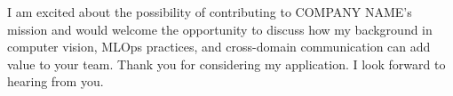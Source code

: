 \documentclass[11pt, a4paper]{awesome-cv}
\begin{document}
\begin{cvletter}



%
%



I am excited about the possibility of contributing to COMPANY NAME's mission and would welcome the opportunity to discuss how my background in computer vision, MLOps practices, and cross-domain communication can add value to your team. Thank you for considering my application. I look forward to hearing from you.

\end{cvletter}


\makeletterclosing
\end{document}

